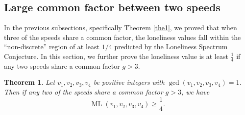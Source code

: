 \documentclass[11pt]{amsart}
\newtheorem{theorem}{Theorem}[section]
\DeclareMathOperator{\ML}{ML}
\begin{document}
\subsection{Large common factor between two speeds}
In the previous subsections, specifically Theorem \ref{the1}, we proved that when three of the speeds share a common factor, the loneliness values fall within the ``non-discrete'' region of at least $1/4$ predicted by the Loneliness Spectrum Conjecture. In this section, we further prove the loneliness value is at least $\frac{1}{4}$ if any two speeds share a common factor $g > 3$. 

\begin{theorem}
    \label{the3}
    Let $v_1, v_2, v_3, v_4$ be positive integers with $\gcd(v_1,v_2,v_3,v_4) = 1$. Then if any two of the speeds share a common factor $g > 3$, we have
    $$\ML(v_1,v_2,v_3,v_4) \geq \frac{1}{4}.$$
\end{theorem}
\end{document}
